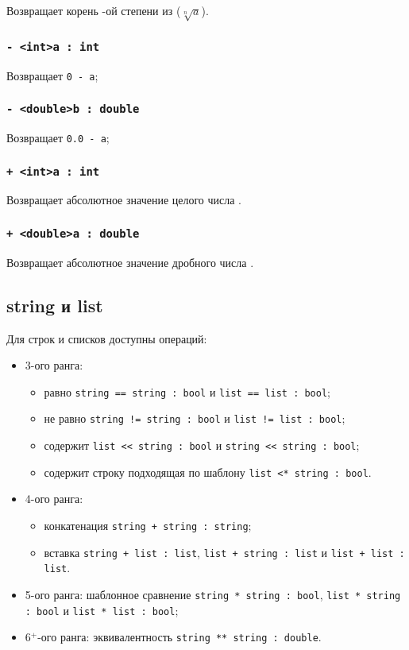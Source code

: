 \documentclass[a4paper, 14pt]{extarticle}
\newenvironment{icItems}
	{ \begin{itemize} [noitemsep,nolistsep] }
	{ \end{itemize} }
\begin{document}
Возвращает корень -ой степени из  ($\sqrt[n]{a}$).


\subsubsection{\lstinline`- <int>a : int`}

Возвращает \lstinline|0 - a|;

\subsubsection{\lstinline`- <double>b : double`}

Возвращает \lstinline|0.0 - a|;

\subsubsection{\lstinline`+ <int>a : int`}

Возвращает абсолютное значение целого числа .

\subsubsection{\lstinline`+ <double>a : double`}

Возвращает абсолютное значение дробного числа .

\subsection{{\color{lightblue}string} и {\color{lightblue}list}}

	Для строк и списков доступны операций:
\begin{icItems}
	\item
		3-ого ранга:
		\begin{icItems}
		\item
			равно \lstinline`string == string : bool` и \lstinline`list == list : bool`;
		\item
			не равно \lstinline`string != string : bool` и \lstinline`list != list : bool`;
		\item
			содержит \lstinline`list << string : bool` и \lstinline`string << string : bool`;
		\item
			содержит строку подходящая по шаблону \lstinline`list <* string : bool`.
		\end{icItems}
	\item
		4-ого ранга:
		\begin{icItems}
		\item
			конкатенация \lstinline`string + string : string`;
		\item
			вставка \lstinline`string + list : list`, \lstinline`list + string : list` и \lstinline`list + list : list`.
		\end{icItems}
	\item
		5-ого ранга: шаблонное сравнение \lstinline`string * string : bool`, \lstinline`list * string : bool` и \lstinline`list * list : bool`;
	\item
		6$^+$-ого ранга: эквивалентность \lstinline`string ** string : double`.
\end{icItems}
\end{document}
